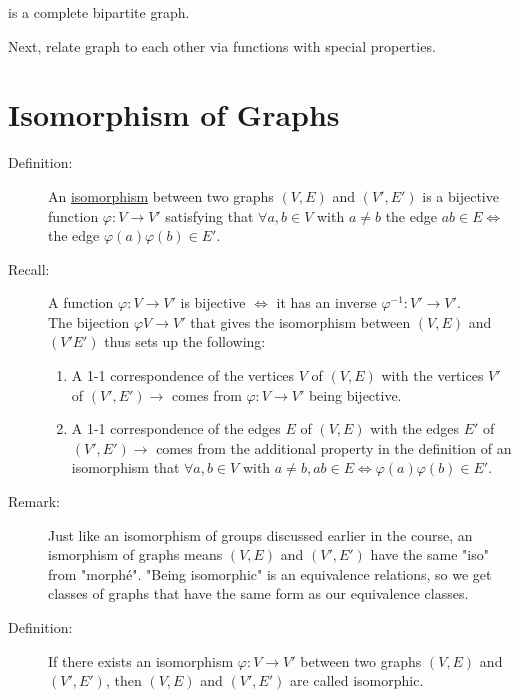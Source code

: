 \documentclass[10pt]{article}
\begin{document}
\begin{description}
\begin{figure}[h!]
		\end{figure}
		is a complete bipartite graph.
		\item Next, relate graph to each other via functions with special properties.
	\end{description}
	
	\section{Isomorphism of Graphs}
	\begin{description}
		\item[Definition:] An \underline{isomorphism} between two graphs $(V, E)$ and $(V',E')$ is a bijective function $\varphi : V \rightarrow V'$ satisfying that $\forall a, b \in V$ with $a \neq b$ the edge $ab \in E \Leftrightarrow$ the edge $\varphi (a) \varphi (b) \in E'$.
		\item[Recall:] A function $\varphi : V \rightarrow V'$ is bijective $\Leftrightarrow$ it has an inverse $\varphi^{-1} : V' \rightarrow V'$. \\
		The bijection $\varphi V \rightarrow V'$ that gives the isomorphism between $(V, E)$ and $(V' E')$ thus sets up the following:
		\begin{enumerate}
			\item A 1-1 correspondence of the vertices $V$ of $(V,E)$ with the vertices $V'$ of $(V',E') \rightarrow$ comes from $\varphi: V \rightarrow V'$ being bijective.
			\item A 1-1 correspondence of the edges $E$ of $(V,E)$ with the edges $E'$ of $(V',E') \rightarrow$ comes from the additional property in the definition of an isomorphism that $\forall a, b \in V$ with $a \neq b, ab \in E \Leftrightarrow \varphi (a) \varphi (b) \in E'$. 
		\end{enumerate}
		\item[Remark:] Just like an isomorphism of groups discussed earlier in the course, an ismorphism of graphs means $(V,E)$ and $(V',E')$ have the same "iso" from "morph\'{e}". "Being isomorphic" is an equivalence relations, so we get classes of graphs that have the same form as our equivalence classes.
		\item[Definition:] If there exists an isomorphism $\varphi :V \rightarrow V'$ between two graphs $(V, E)$ and $(V', E')$, then $(V, E)$ and $(V', E')$ are called isomorphic.
	\end{description}
	
\end{document}
